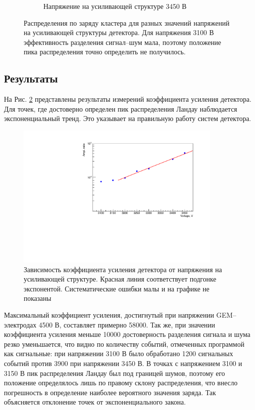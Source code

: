 \begin{figure}[h]
\begin{subfigure}{.45\textwidth}
	\caption{Напряжение на усиливающей структуре 3450 В}
\end{subfigure}
\caption{Распределения по заряду кластера для разных значений напряжений на усиливающей структуры детектора. Для напряжения 3100 В эффективность разделения сигнал--шум мала, поэтому положение пика распределения точно определить не получилось.}
\label{fig:charge_landau}
\end{figure}

\subsection{Результаты}
На Рис. \ref{fig:ampl_graph} представлены результаты измерений коэффициента усиления детектора. Для точек, где достоверно определен пик распределения Ландау наблюдается экспоненциальный тренд. Это указывает на правильную работу систем детектора.
\begin{figure}[h]
	\centering
	\includegraphics[width = 10cm]{img/Ampl_gr_log.pdf}
	\caption{Зависимость коэффициента усиления детектора от напряжения на усиливающей структуре. Красная линия соответствует подгонке экспонентой. Систематические ошибки малы и на графике не показаны}
	\label{fig:ampl_graph}
\end{figure}
Максимальный коэффициент усиления, достигнутый при напряжении GEM--электродах 4500 В, составляет примерно 58000. Так же, при значении коэффициента усиления меньше 10000 достоверность разделения сигнала и шума резко уменьшается, что видно по количеству событий, отмеченных программой как сигнальные: при напряжении 3100 В было обработано 1200 сигнальных событий против 3900 при напряжении 3450 В. В точках с напряжением 3100 и 3150 В пик распределения Ландау был под границей шумов, поэтому его положение определялось лишь по правому склону распределения, что внесло погрешность в определение наиболее вероятного значения заряда. Так объясняется отклонение точек от экспоненциального закона. 

